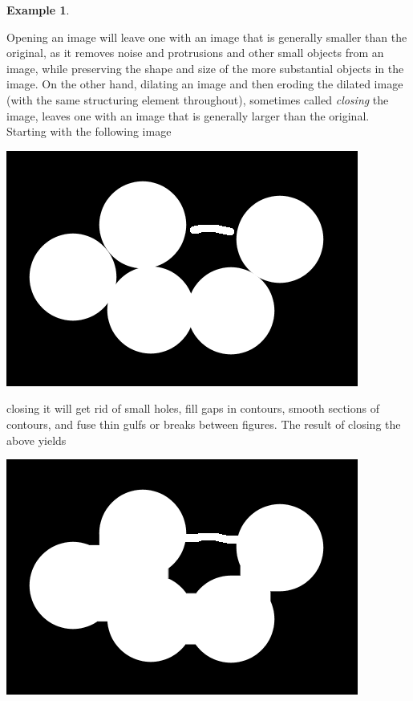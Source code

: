 \documentclass[11pt]{book}
\theoremstyle{definition}
\newtheorem{example}{Example}[section]
\theoremstyle{definition}
\theoremstyle{definition}
\theoremstyle{theorem}
\theoremstyle{definition}
\begin{document}
\begin{example}
\begin{center}
	\end{center}
	Opening an image will leave one with an image that is generally smaller than the original, as it removes noise and protrusions and other small objects from an image, while preserving the shape and size of the more substantial objects in the image. On the other hand, dilating an image and then eroding the dilated image (with the same structuring element throughout), sometimes called \textit{closing}  the image, leaves one with an image that is generally larger than the original. Starting with the following image
	\begin{center}
		\includegraphics*[scale=0.27]{CirclesOriginal.png}
	\end{center}
	closing it will get rid of small holes, fill gaps in contours, smooth sections of contours, and fuse thin gulfs or breaks between figures. The result of closing the above yields
	\begin{center}
		\includegraphics*[scale=0.27]{CirclesAfterClosing.png}
	\end{center} 

\end{example}
\end{document}
